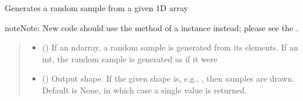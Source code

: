\documentclass[letterpaper,10pt,english]{sphinxmanual}
\begin{document}
\begin{fulllineitems}
\label{\detokenize{metilda.controllers:metilda.controllers.pitch_art_wizard.choice}}
\pysigstartsignatures
{}
\pysigstopsignatures
\sphinxAtStartPar
Generates a random sample from a given 1\sphinxhyphen{}D array

\sphinxAtStartPar
{}

\begin{sphinxadmonition}{note}{Note:}
\sphinxAtStartPar
New code should use the 
method of a  instance instead;
please see the .
\end{sphinxadmonition}
\begin{quote}\begin{description}
\begin{itemize}
\item {} 
\sphinxAtStartPar
{} () \textendash{} If an ndarray, a random sample is generated from its elements.
If an int, the random sample is generated as if it were 

\item {} 
\sphinxAtStartPar
{} (\sphinxstyleliteralemphasis{\sphinxupquote{, }}) \textendash{} Output shape.  If the given shape is, e.g., , then
 samples are drawn.  Default is None, in which case a
single value is returned.


\end{itemize}
\end{description}
\end{quote}
\end{fulllineitems}
\end{document}
